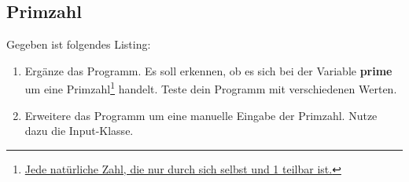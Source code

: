 \subsection{Primzahl }
Gegeben ist folgendes Listing:
\begin{enumerate}
	\item Ergänze das Programm. Es soll erkennen, ob es sich bei der Variable \textbf{prime} um eine Primzahl\footnote{\href{https://de.wikipedia.org/wiki/Primzahl}{Jede natürliche Zahl, die nur durch sich selbst und 1 teilbar ist.}} handelt. Teste dein Programm mit verschiedenen Werten.
	\item Erweitere das Programm um eine manuelle Eingabe der Primzahl. Nutze dazu die Input-Klasse.
\end{enumerate}
